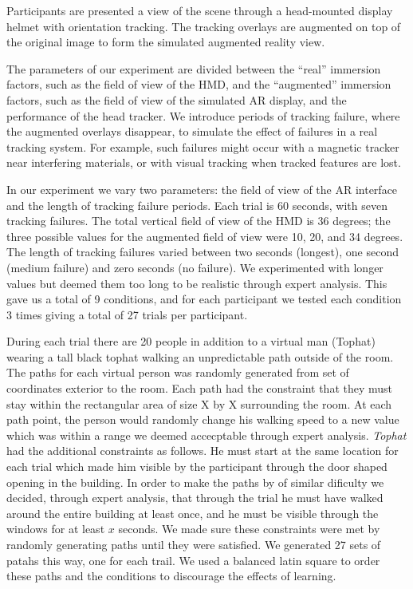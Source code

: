 \documentclass{acmsiggraph}                     %
\begin{document}
Participants are presented a view of the scene through a head-mounted display helmet with orientation tracking.  The tracking overlays are augmented on top of the original image to form the simulated augmented reality view.

The parameters of our experiment are divided between the ``real'' immersion factors, such as the field of view of the HMD, and the ``augmented'' immersion factors, such as the field of view of the simulated AR display, and the performance of the head tracker.  We introduce periods of tracking failure, where the augmented overlays disappear, to simulate the effect of failures in a real tracking system.  For example, such failures might occur with a magnetic tracker near interfering materials, or with visual tracking when tracked features are lost.

In our experiment we vary two parameters: the field of view of the AR interface and the length of tracking failure periods.  Each trial is 60 seconds, with seven tracking failures.  The total vertical field of view of the HMD is 36 degrees; the three possible values for the augmented field of view were 10, 20, and 34 degrees.  The length of tracking failures varied between two seconds (longest), one second (medium failure) and zero seconds (no failure).  We experimented with longer values but deemed them too long to be realistic through expert analysis.  This gave us a total of 9 conditions, and for each participant we tested each condition 3 times giving a total of 27 trials per participant.

During each trial there are 20 people in addition to a virtual man (Tophat) wearing a tall black tophat walking an unpredictable path outside of the room.  The paths for each virtual person was randomly generated from set of coordinates exterior to the room.  Each path had the constraint that they must stay within the rectangular area of size X by X surrounding the room.  At each path point, the person would randomly change his walking speed to a new value which was within a range we deemed accecptable through expert analysis.  \emph{Tophat} had the additional constraints as follows.  He must start at the same location for each trial which made him visible by the participant through the door shaped opening in the building.  In order to make the paths by of similar dificulty we decided, through expert analysis, that through the trial he must have walked around the entire building at least once, and he must be visible through the windows for at least $x$ seconds.  We made sure these constraints were met by randomly generating paths until they were satisfied.  We generated 27 sets of patahs this way, one for each trail.  We used a balanced latin square to order these paths and the conditions to discourage the effects of learning.
\end{document}
